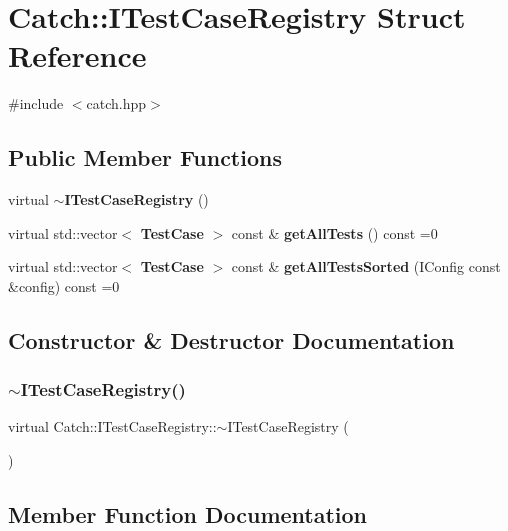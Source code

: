 \section{Catch\+:\+:I\+Test\+Case\+Registry Struct Reference}
\label{struct_catch_1_1_i_test_case_registry}


{\ttfamily \#include $<$catch.\+hpp$>$}

\subsection*{Public Member Functions}
\begin{DoxyCompactItemize}
\item 
virtual \textbf{ $\sim$\+I\+Test\+Case\+Registry} ()
\item 
virtual std\+::vector$<$ \textbf{ Test\+Case} $>$ const  \& \textbf{ get\+All\+Tests} () const =0
\item 
virtual std\+::vector$<$ \textbf{ Test\+Case} $>$ const  \& \textbf{ get\+All\+Tests\+Sorted} (I\+Config const \&config) const =0
\end{DoxyCompactItemize}


\subsection{Constructor \& Destructor Documentation}
\mbox{\label{struct_catch_1_1_i_test_case_registry_ae14798f05ac8e2b18cff532849a4da81}} 
\subsubsection{$\sim$\+I\+Test\+Case\+Registry()}
{\footnotesize\ttfamily virtual Catch\+::\+I\+Test\+Case\+Registry\+::$\sim$\+I\+Test\+Case\+Registry (\begin{DoxyParamCaption}{ }\end{DoxyParamCaption})\hspace{0.3cm}{\ttfamily [virtual]}}



\subsection{Member Function Documentation}
\mbox{\label{struct_catch_1_1_i_test_case_registry_ad6e4d4a621655123f73ae98cfeda063d}} 
